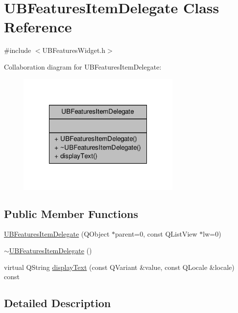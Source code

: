 \hypertarget{class_u_b_features_item_delegate}{\section{U\-B\-Features\-Item\-Delegate Class Reference}
\label{db/d72/class_u_b_features_item_delegate}
}


{\ttfamily \#include $<$U\-B\-Features\-Widget.\-h$>$}



Collaboration diagram for U\-B\-Features\-Item\-Delegate\-:
\nopagebreak
\begin{figure}[H]
\begin{center}
\leavevmode
\includegraphics[width=228pt]{de/dd4/class_u_b_features_item_delegate__coll__graph}
\end{center}
\end{figure}
\subsection*{Public Member Functions}
\begin{DoxyCompactItemize}
\item 
\hyperlink{class_u_b_features_item_delegate_aaddde1283ab7577da12b3990aa606895}{U\-B\-Features\-Item\-Delegate} (Q\-Object $\ast$parent=0, const Q\-List\-View $\ast$lw=0)
\item 
\hyperlink{class_u_b_features_item_delegate_a44cf593b7b7c4ef043bf5adab3a4c0b3}{$\sim$\-U\-B\-Features\-Item\-Delegate} ()
\item 
virtual Q\-String \hyperlink{class_u_b_features_item_delegate_afd3f77db2fbd681c29c933b1877d07d6}{display\-Text} (const Q\-Variant \&value, const Q\-Locale \&locale) const 
\end{DoxyCompactItemize}


\subsection{Detailed Description}


